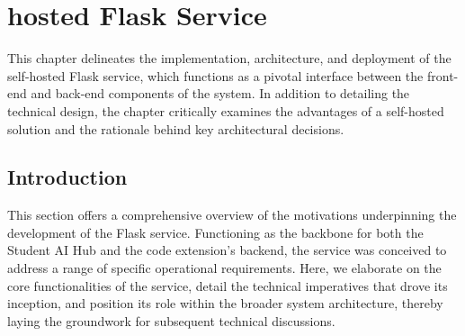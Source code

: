 \chapter{hosted Flask Service}
\label{cha:hosted_flask_service}

This chapter delineates the implementation, architecture, and deployment of the self-hosted Flask service, 
which functions as a pivotal interface between the front-end and back-end components of the system. 
In addition to detailing the technical design, the chapter critically examines the advantages of a self-hosted solution 
and the rationale behind key architectural decisions.



\section{Introduction}
This section offers a comprehensive overview of the motivations underpinning the development of the Flask service. 
Functioning as the backbone for both the Student AI Hub and the code extension’s backend, 
the service was conceived to address a range of specific operational requirements. 
Here, we elaborate on the core functionalities of the service, detail the technical imperatives that drove its inception, 
and position its role within the broader system architecture, thereby laying the groundwork for subsequent technical discussions.

